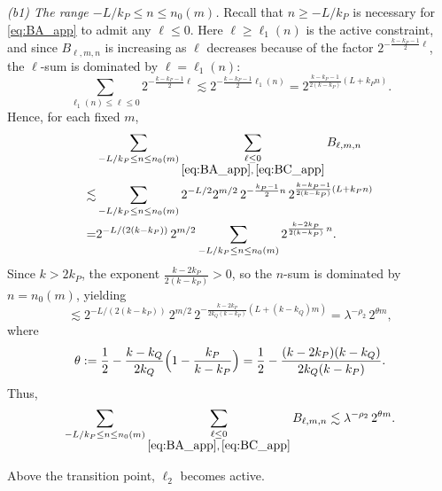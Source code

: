 \documentclass[10pt]{amsart}
\numberwithin{equation}{section}
\theoremstyle{definition}
\theoremstyle{remark}
\theoremstyle{remark}
\begin{document}
	\smallskip
	\noindent\emph{(b1) The range $-L/k_P\le n\le n_0(m)$.}
	Recall that $n\ge -L/k_P$ is necessary for \eqref{eq:BA_app} to admit any $\ell\le 0$.
	Here $\ell\ge \ell_1(n)$ is the active constraint, and since $B_{\ell,m,n}$ is increasing as $\ell$ decreases
	because of the factor $2^{-\frac{k-k_P-1}{2}\ell}$, the $\ell$-sum is dominated by $\ell=\ell_1(n)$:
	\[
	\sum_{\ell_1(n)\le \ell\le 0}
	2^{-\frac{k-k_P-1}{2}\ell}
	\lesssim
	2^{-\frac{k-k_P-1}{2}\ell_1(n)}
	=
	2^{\frac{k-k_P-1}{2(k-k_P)}(L+k_P n)}.
	\]
	Hence, for each fixed $m$,
	\begin{align*}
		&\sum_{-L/k_P\le n\le n_0(m)}
		\sum_{\substack{\ell\le 0\\ \eqref{eq:BA_app},\,\eqref{eq:BC_app}}}
		B_{\ell,m,n}\\
		\lesssim
		&\sum_{-L/k_P\le n\le n_0(m)}
		2^{-L/2}2^{m/2}\,
		2^{-\frac{k_P-1}{2}n}\,
		2^{\frac{k-k_P-1}{2(k-k_P)}(L+k_P n)}\\
		=&2^{-L/(2(k-k_P))}\,2^{m/2}
		\sum_{-L/k_P\le n\le n_0(m)}
		2^{\frac{k-2k_P}{2(k-k_P)}\,n}.
	\end{align*}
	Since $k>2k_P$, the exponent $\frac{k-2k_P}{2(k-k_P)}>0$, so the $n$-sum is dominated by $n=n_0(m)$, yielding
	\[
	\lesssim
	2^{-L/(2(k-k_P))}\,2^{m/2}\,
	2^{-\frac{k-2k_P}{2k_Q(k-k_P)}(L+(k-k_Q)m)}
	=
	\lambda^{-\rho_2}\,2^{\theta m},
	\]
	where
	\begin{equation}\label{eq:theta_def}
		\theta:=
		\frac12-\frac{k-k_Q}{2k_Q}\Bigl(1-\frac{k_P}{k-k_P}\Bigr)
		=
		\frac12-\frac{(k-2k_P)(k-k_Q)}{2k_Q(k-k_P)}.
	\end{equation}
	Thus,
	\begin{align}\label{eq:b1}
		\sum_{-L/k_P\le n\le n_0(m)}
		\sum_{\substack{\ell\le 0\\ \eqref{eq:BA_app},\,\eqref{eq:BC_app}}}
		B_{\ell,m,n}
		\lesssim
		\lambda^{-\rho_2}\,2^{\theta m}.
	\end{align}
	
    Above the transition point,
    $\ell_2$ becomes active.
    
\end{document}
